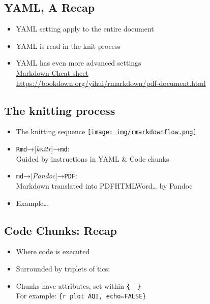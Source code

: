 \documentclass[
]{article}
\providecommand{\tightlist}{%
  \setlength{\itemsep}{0pt}\setlength{\parskip}{0pt}}
\begin{document}
\subsection{YAML, A Recap}\label{yaml-a-recap}

\begin{itemize}
\tightlist
\item
  YAML setting apply to the entire document
\item
  YAML is read in the knit process
\item
  YAML has even more advanced settings\\
  \href{https://raw.githubusercontent.com/rstudio/cheatsheets/main/rmarkdown.pdf}{Markdown
  Cheat sheet}\\
  \url{https://bookdown.org/yihui/rmarkdown/pdf-document.html}
\end{itemize}

\subsection{The knitting process}\label{the-knitting-process}

\begin{itemize}
\tightlist
\item
  The knitting sequence
  \href{https://env872.github.io/assets/images/rmarkdownflow.png}{\texttt{[image: img/rmarkdownflow.png]}}
\item
  \texttt{Rmd}→{[}\emph{knitr}{]}→\texttt{md}:\\
  Guided by instructions in YAML \& Code chunks
\item
  \texttt{md}→{[}\emph{Pandoc}{]}→\texttt{PDF}:\\
  Markdown translated into PDF\textbar HTML\textbar Word\textbar\ldots{}
  by Pandoc
\item
  Example\ldots{}
\end{itemize}

\subsection{Code Chunks: Recap}\label{code-chunks-recap}

\begin{itemize}
\tightlist
\item
  Where code is executed
\item
  Surrounded by triplets of tics:
  \texttt{\textasciigrave{}\textasciigrave{}\textasciigrave{}}
\item
  Chunks have attributes, set within \texttt{\{\ \ \}}\\
  For example: \texttt{\{r\ plot\ AQI,\ echo=FALSE\}}
\end{itemize}
\end{document}
